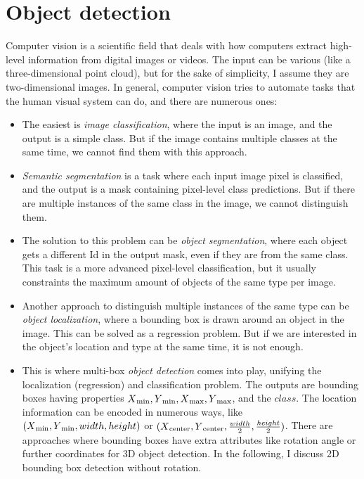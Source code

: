 \chapter{Object detection}

Computer vision is a scientific field that deals with how computers extract high-level information from digital images or videos. The input can be various (like a three-dimensional point cloud), but for the sake of simplicity, I assume they are two-dimensional images. In general, computer vision tries to automate tasks that the human visual system can do, and there are numerous ones:

\begin{itemize}
  \item The easiest is \textit{image classification}, where the input is an image, and the output is a simple class. But if the image contains multiple classes at the same time, we cannot find them with this approach.
  \item \textit{Semantic segmentation} is a task where each input image pixel is classified, and the output is a mask containing pixel-level class predictions. But if there are multiple instances of the same class in the image, we cannot distinguish them.
  \item The solution to this problem can be \textit{object segmentation}, where each object gets a different Id in the output mask, even if they are from the same class. This task is a more advanced pixel-level classification, but it usually constraints the maximum amount of objects of the same type per image.
  \item Another approach to distinguish multiple instances of the same type can be \textit{object localization}, where a bounding box is drawn around an object in the image. This can be solved as a regression problem. But if we are interested in the object's location and type at the same time, it is not enough.
  \item This is where multi-box \textit{object detection} comes into play, unifying the localization (regression) and classification problem. The outputs are bounding boxes having properties \(X\textsubscript{min}, Y\textsubscript{min}, X\textsubscript{max}, Y\textsubscript{max}\), and the \(class\). The location information can be encoded in numerous ways, like \((X\textsubscript{min}, Y\textsubscript{min}, width, height)\) or \((X\textsubscript{center}, Y\textsubscript{center}, \frac{width}{2}, \frac{height}{2})\). There are approaches where bounding boxes have extra attributes like rotation angle or further coordinates for 3D object detection. In the following, I discuss 2D bounding box detection without rotation.
\end{itemize}

